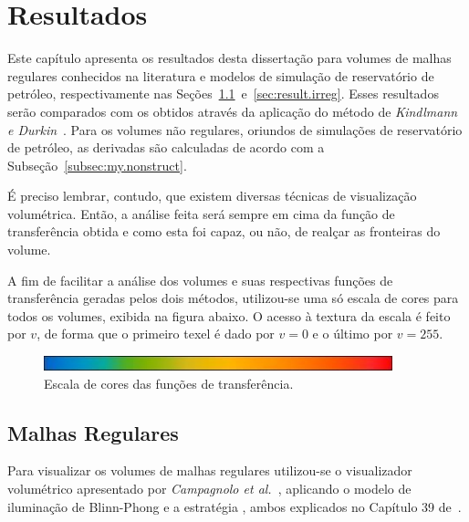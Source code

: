 
\chapter{Resultados}
\label{ch:result}

	Este capítulo apresenta os resultados desta dissertação para volumes de malhas regulares conhecidos na literatura e modelos de simulação de reservatório de petróleo, respectivamente nas Seções~\ref{sec:result.reg}~e~\ref{sec:result.irreg}. Esses resultados serão comparados com os obtidos através da aplicação do método de \textit{Kindlmann e Durkin}~\cite{gordon}. Para os volumes não regulares, oriundos de simulações de reservatório de petróleo, as derivadas são calculadas de acordo com a Subseção~\ref{subsec:my.nonstruct}.
	
	É preciso lembrar, contudo, que existem diversas técnicas de visualização volumétrica. Então, a análise feita será sempre em cima da função de transferência obtida e como esta foi capaz, ou não, de realçar as fronteiras do volume.
	
	A fim de facilitar a análise dos volumes e suas respectivas funções de transferência geradas pelos dois métodos, utilizou-se uma só escala de cores para todos os volumes, exibida na figura abaixo. O acesso à textura da escala é feito por $ v $, de forma que o primeiro texel é dado por $ v = 0 $ e o último por $ v = 255 $.

\begin{figure}[h]
	\centering
	\includegraphics[width=0.9\textwidth]{images/r_colorscale}
	\caption{Escala de cores das funções de transferência.}
\end{figure}
	
\section{Malhas Regulares}
\label{sec:result.reg}

	Para visualizar os volumes de malhas regulares utilizou-se o visualizador volumétrico apresentado por \textit{Campagnolo et al.}~\cite{lqc}, aplicando o modelo de iluminação de Blinn-Phong e a estratégia , ambos explicados no Capítulo 39 de~\cite{gems}.

